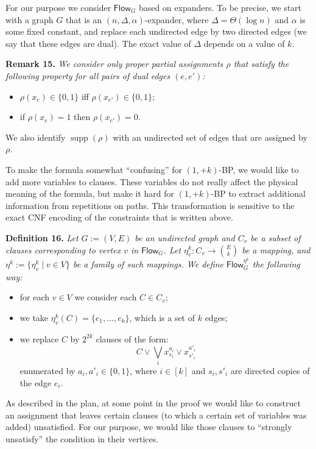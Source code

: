 \documentclass[10pt,a4paper]{article}
\newcommand{\Flow}{\mathsf{Flow}}
\newcommand{\supp}{\operatorname{supp}}
\newenvironment{result}[1]{\par\medskip\noindent\textbf{#1.}\itshape}{\par\medskip}
\begin{document}
For our purpose we consider $\Flow_G$ based on expanders. To be precise, we start with a graph $G$ that is an $(n,\Delta,\alpha)$-expander, where $\Delta=\Theta(\log n)$ and $\alpha$ is some fixed constant, and replace each undirected edge by two directed edges (we say that these edges are dual). The exact value of $\Delta$ depends on a value of $k$.
\begin{result}{Remark 15}
We consider only proper partial assignments $\rho$ that satisfy the following property for all pairs of dual edges $(e,e')$:
\begin{itemize}\item $\rho(x_e)\in\{0,1\}$ iff $\rho(x_{e'})\in\{0,1\}$;
\item if $\rho(x_e)=1$ then $\rho(x_{e'})=0$.\end{itemize}
We also identify $\supp(\rho)$ with an undirected set of edges that are assigned by $\rho$.
\end{result}
To make the formula somewhat ``confusing'' for $(1,+k)$-BP, we would like to add more variables to clauses. These variables do not really affect the physical meaning of the formula, but make it hard for $(1,+k)$-BP to extract additional information from repetitions on paths. This transformation is sensitive to the exact CNF encoding of the constraints that is written above.
\begin{result}{Definition 16}
Let $G:=(V,E)$ be an undirected graph and $C_v$ be a subset of clauses corresponding to vertex $v$ in $\Flow_G$. Let $\eta_v^k:C_v\to\binom{E}{k}$ be a mapping, and $\eta^k:=\{\eta_v^k\mid v\in V\}$ be a family of such mappings. We define $\Flow_G^{\eta^k}$ the following way:
\begin{itemize}\item for each $v\in V$ we consider each $C\in C_v$;
\item we take $\eta_v^k(C)=\{e_1,\ldots,e_k\}$, which is a set of $k$ edges;
\item we replace $C$ by $2^{2k}$ clauses of the form:
\[C\vee\bigvee_i x_{s_i}^{a_i}\vee x_{s'_i}^{a'_i}\]
enumerated by $a_i,a'_i\in\{0,1\}$, where $i\in[k]$ and $s_i,s'_i$ are directed copies of the edge $e_i$.\end{itemize}
\end{result}
As described in the plan, at some point in the proof we would like to construct an assignment that leaves certain clauses (to which a certain set of variables was added) unsatisfied. For our purpose, we would like those clauses to ``strongly unsatisfy'' the condition in their vertices.
\end{document}
